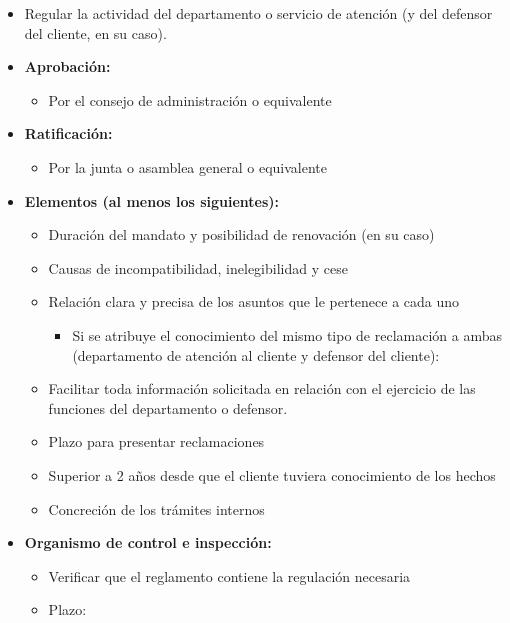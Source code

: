 \documentclass[
]{article}
\providecommand{\tightlist}{%
  \setlength{\itemsep}{0pt}\setlength{\parskip}{0pt}}
\begin{document}
\begin{itemize}
\tightlist
\item
  Regular la actividad del departamento o servicio de atención (y del
  defensor del cliente, en su caso).
\item
  \textbf{Aprobación:}

  \begin{itemize}
  \tightlist
  \item
    Por el consejo de administración o equivalente
  \end{itemize}
\item
  \textbf{Ratificación:}

  \begin{itemize}
  \tightlist
  \item
    Por la junta o asamblea general o equivalente
  \end{itemize}
\item
  \textbf{Elementos (al menos los siguientes):}

  \begin{itemize}
  \tightlist
  \item
    Duración del mandato y posibilidad de renovación (en su caso)
  \item
    Causas de incompatibilidad, inelegibilidad y cese
  \item
    Relación clara y precisa de los asuntos que le pertenece a cada uno

    \begin{itemize}
    \tightlist
    \item
      Si se atribuye el conocimiento del mismo tipo de reclamación a
      ambas (departamento de atención al cliente y defensor del
      cliente):
    \end{itemize}
  \item
    Facilitar toda información solicitada en relación con el ejercicio
    de las funciones del departamento o defensor.
  \item
    Plazo para presentar reclamaciones
  \item
    Superior a 2 años desde que el cliente tuviera conocimiento de los
    hechos
  \item
    Concreción de los trámites internos
  \end{itemize}
\item
  \textbf{Organismo de control e inspección:}

  \begin{itemize}
  \tightlist
  \item
    Verificar que el reglamento contiene la regulación necesaria
  \item
    Plazo:


\end{itemize}
\end{itemize}
\end{document}
